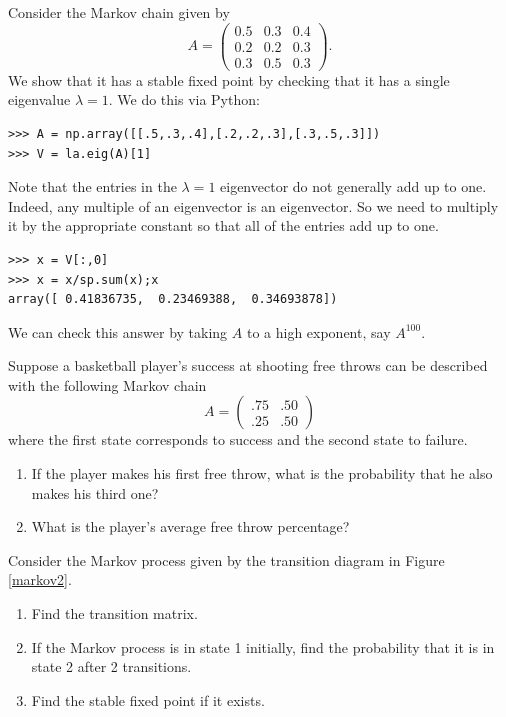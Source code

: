 Consider the Markov chain given by
\[
A = \begin{pmatrix}
0.5 & 0.3 & 0.4\\
0.2 & 0.2 & 0.3\\
0.3 & 0.5 & 0.3
\end{pmatrix}.
\]
We show that it has a stable fixed point by checking that it has a single eigenvalue $\lambda=1$.
We do this via Python:
\begin{lstlisting}
>>> A = np.array([[.5,.3,.4],[.2,.2,.3],[.3,.5,.3]])
>>> V = la.eig(A)[1]
\end{lstlisting}
Note that the entries in the $\lambda=1$ eigenvector do not generally add up to one.
Indeed, any multiple of an eigenvector is an eigenvector.
So we need to multiply it by the appropriate constant so that all of the entries add up to one.
\begin{lstlisting}
>>> x = V[:,0]
>>> x = x/sp.sum(x);x
array([ 0.41836735,  0.23469388,  0.34693878])
\end{lstlisting}
We can check this answer by taking $A$ to a high exponent, say $A^{100}$.

\begin{problem}
Suppose a basketball player's success at shooting free throws can be described with the following Markov chain
\[
A = \begin{pmatrix}.75&.50\\.25&.50\end{pmatrix}
\]
where the first state corresponds to success and the second state to failure.
\begin{enumerate}
\item If the player makes his first free throw, what is the probability that he also makes his third one?
\item What is the player's average free throw percentage?
\end{enumerate}
\end{problem}

\begin{problem}
Consider the Markov process given by the transition diagram in Figure \ref{markov2}.
\begin{enumerate}
\item Find the transition matrix.
\item If the Markov process is in state 1 initially, find the probability that it is in state 2 after 2 transitions.
\item Find the stable fixed point if it exists.
\end{enumerate}
\end{problem}

